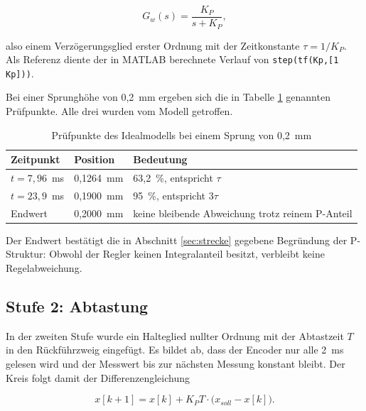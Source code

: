 \begin{equation}
    G_w(s) = \frac{K_P}{s + K_P} ,
    \label{eq:fuehrung}
\end{equation}

also einem Verzögerungsglied erster Ordnung mit der Zeitkonstante $\tau = 1/K_P$. Als
Referenz diente der in MATLAB berechnete Verlauf von \texttt{step(tf(Kp,[1 Kp]))}.

Bei einer Sprunghöhe von 0,2~mm ergeben sich die in Tabelle \ref{tab:stufe1} genannten
Prüfpunkte. Alle drei wurden vom Modell getroffen.

\begin{table}[htbp]
    \centering
    \caption{Prüfpunkte des Idealmodells bei einem Sprung von 0,2~mm}
    \label{tab:stufe1}
    \begin{tabular}{llp{6cm}}
        \hline
        Zeitpunkt & Position & Bedeutung \\
        \hline
        $t = 7{,}96$~ms  & 0,1264~mm & 63,2~\%, entspricht $\tau$ \\
        $t = 23{,}9$~ms  & 0,1900~mm & 95~\%, entspricht $3\tau$ \\
        Endwert          & 0,2000~mm & keine bleibende Abweichung trotz reinem P-Anteil \\
        \hline
    \end{tabular}
\end{table}

Der Endwert bestätigt die in Abschnitt \ref{sec:strecke} gegebene Begründung der
P-Struktur: Obwohl der Regler keinen Integralanteil besitzt, verbleibt keine
Regelabweichung.

\subsection*{Stufe 2: Abtastung}

In der zweiten Stufe wurde ein Halteglied nullter Ordnung mit der Abtastzeit $T$ in den
Rückführzweig eingefügt. Es bildet ab, dass der Encoder nur alle 2~ms gelesen wird und
der Messwert bis zur nächsten Messung konstant bleibt. Der Kreis folgt damit der
Differenzengleichung

\begin{equation}
    x[k+1] = x[k] + K_P T \cdot \big(x_{soll} - x[k]\big) .
    \label{eq:diskret}
\end{equation}

